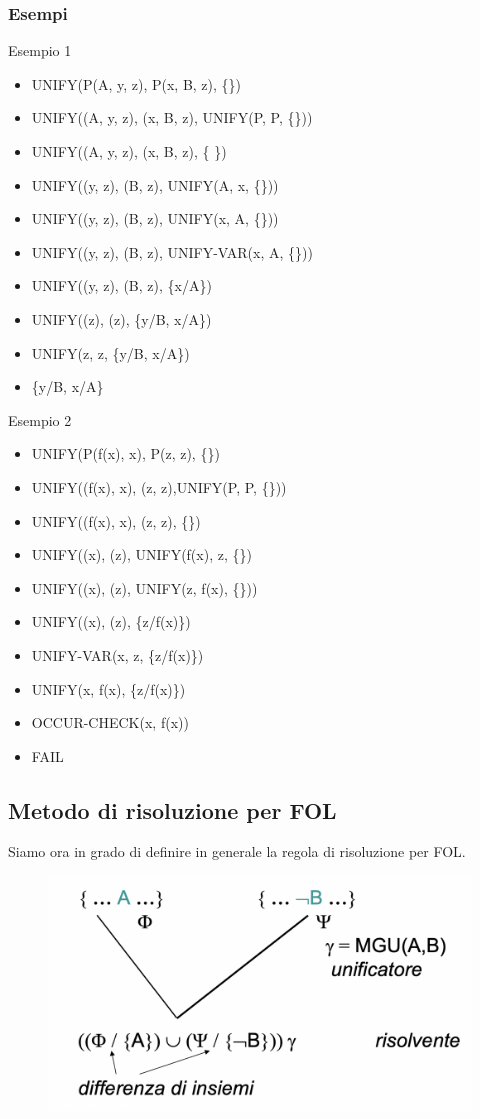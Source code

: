 \documentclass{article}
\begin{document}
\subsubsection{Esempi}
Esempio 1
\begin{itemize}
    \item UNIFY(P(A, y, z), P(x, B, z), \{\})
    \item UNIFY((A, y, z), (x, B, z), UNIFY(P, P, \{\}))
    \item UNIFY((A, y, z), (x, B, z), \{ \})
    \item UNIFY((y, z), (B, z), UNIFY(A, x, \{\}))
    \item UNIFY((y, z), (B, z), UNIFY(x, A, \{\}))
    \item UNIFY((y, z), (B, z), UNIFY-VAR(x, A, \{\}))
    \item UNIFY((y, z), (B, z), \{x/A\})
    \item UNIFY((z), (z), \{y/B, x/A\})
    \item UNIFY(z, z, \{y/B, x/A\})
    \item \{y/B, x/A\}	
\end{itemize}
\clearpage
Esempio 2
\begin{itemize}
    \item UNIFY(P(f(x), x), P(z, z), \{\})
    \item UNIFY((f(x), x), (z, z),UNIFY(P, P, \{\}))
    \item UNIFY((f(x), x), (z, z), \{\})
    \item UNIFY((x), (z), UNIFY(f(x), z, \{\})
    \item UNIFY((x), (z), UNIFY(z, f(x), \{\}))
    \item UNIFY((x), (z), \{z/f(x)\})
    \item UNIFY-VAR(x, z, \{z/f(x)\})
    \item UNIFY(x, f(x), \{z/f(x)\})
    \item OCCUR-CHECK(x, f(x))
    \item FAIL
\end{itemize}

\subsection{Metodo di risoluzione per FOL}
Siamo ora in grado di definire in generale la regola di risoluzione per FOL.
\begin{figure}[H]
\centering
\includegraphics[scale=0.35]{Images/FOLresolmethod.png}
\end{figure}
\end{document}

